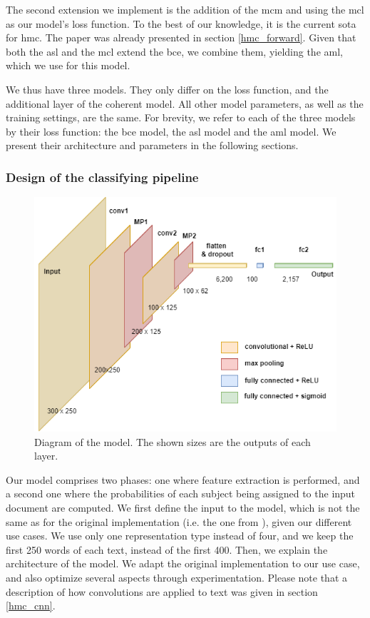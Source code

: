 The second extension we implement is the addition of the \acrlong{mcm} and using the \acrfull{mcl} \cite{giunchiglia2020coherent} as our model's loss function. To the best of our knowledge, it is the current \acrshort{sota} for \acrshort{hmc}. The paper was already presented in section \ref{hmc_forward}. Given that both the \acrshort{asl} and the \acrshort{mcl} extend the \acrshort{bce}, we combine them, yielding the \acrlong{aml}, which we use for this model.

We thus have three models. They only differ on the loss function, and the additional layer of the coherent model. All other model parameters, as well as the training settings, are the same. For brevity, we refer to each of the three models by their loss function: the \acrshort{bce} model, the \acrshort{asl} model and the \acrshort{aml} model. We present their architecture and parameters in the following sections.

\subsubsection{Design of the classifying pipeline} \label{supervised_approach_design}

\begin{figure}
    \centering
    \includegraphics[width=.85\textwidth]{figures/supervised_approach/model_diagram.png}
    \caption{Diagram of the model. The shown sizes are the outputs of each layer.}
    \label{fig:model_diagram}
\end{figure}

Our model comprises two phases: one where feature extraction is performed, and a second one where the probabilities of each subject being assigned to the input document are computed. We first define the input to the model, which is not the same as for the original implementation (i.e. the one from \cite{gargiulo2019deep}), given our different use cases. We use only one representation type instead of four, and we keep the first 250 words of each text, instead of the first 400. Then, we explain the architecture of the model. We adapt the original implementation to our use case, and also optimize several aspects through experimentation. Please note that a description of how convolutions are applied to text was given in section \ref{hmc_cnn}.


